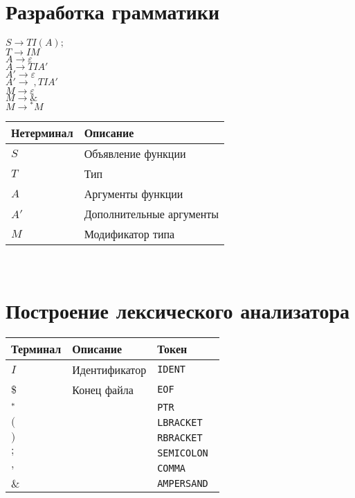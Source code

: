 \documentclass[12pt, a4paper]{article}
\begin{document}
\section{Разработка грамматики}

$ S \rightarrow TI(A); $ \\
$ T \rightarrow IM $ \\
$ A \rightarrow \varepsilon $ \\
$ A \rightarrow TIA'$ \\
$ A' \rightarrow \varepsilon $ \\
$ A' \rightarrow \;,TIA' $ \\
$ M \rightarrow \varepsilon $ \\
$ M \rightarrow \& $ \\
$ M \rightarrow {}^*M $ \\

\begin{tabular}[t]{|p{7em}|p{16em}|}
\hline
	\bf{Нетерминал} & \bf{Описание} \\
\hline
	$ S $ & Объявление функции\\
\hline
	$ T $ & Тип \\
\hline
	$ A $ & Аргументы функции \\
\hline
	$ A' $ & Дополнительные аргументы \\
\hline
	$ M $ & Модификатор типа \\
\hline
\end{tabular}
\\
\section{Построение лексического анализатора}
\begin{tabular}[t]{|p{7em}|p{8em}|p{7em}|}
\hline
	\bf{Терминал} & \bf{Описание} & \bf{Токен} \\
\hline
	$ I $ & Идентификатор & \tt{IDENT} \\
\hline
	$ \$ $ & Конец файла & \tt{EOF} \\
\hline
	$ {}^* $ &  & \tt{PTR} \\
\hline
	$ ( $ &  & \tt{LBRACKET} \\
\hline
	$ ) $ &  & \tt{RBRACKET} \\
\hline
	$ ; $ &  & \tt{SEMICOLON} \\
\hline
	$ , $ &  & \tt{COMMA} \\
\hline
	$ \& $ &  & \tt{AMPERSAND} \\
\hline
\end{tabular}
\\
\end{document}
